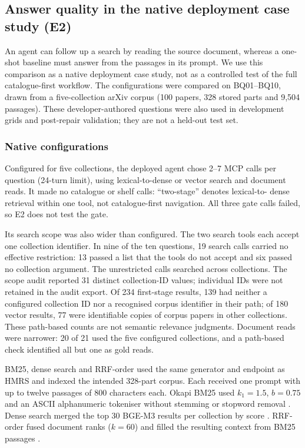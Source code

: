 \subsection{Answer quality in the native deployment case study (E2)}
\label{sec:e10}
\label{sec:external-baselines}
\label{sec:exp-e2}
An agent can follow up a search by reading the source document, whereas a
one-shot baseline must answer from the passages in its prompt. We use this
comparison as a native deployment case study, not as a controlled test of the
full catalogue-first workflow. The configurations were compared on BQ01--BQ10,
drawn from a five-collection
arXiv corpus (100 papers, 328 stored parts and 9{,}504 passages). These
developer-authored questions were also used in development grids and
post-repair validation; they are not a held-out test set.

\subsubsection{Native configurations}
Configured for five collections, the deployed agent chose 2--7 MCP calls per
question (24-turn limit), using lexical-to-dense or vector search and document
reads. It made no catalogue or shelf calls: ``two-stage'' denotes lexical-to-
dense retrieval within one tool, not catalogue-first navigation. All three
gate calls failed, so E2 does not test the gate.

Its search scope was also wider than configured. The two search tools each
accept one collection identifier. In nine of the ten questions, 19 search
calls carried no effective restriction: 13 passed a list that the tools do
not accept and six passed no collection argument. The unrestricted calls
searched across collections. The scope audit reported 31 distinct
collection-ID values; individual IDs were not retained in the audit export.
Of 234 first-stage results, 139 had neither a
configured collection ID nor a recognised corpus identifier in their path;
of 180 vector results, 77 were identifiable copies of corpus papers in
other collections. These path-based counts are not semantic relevance
judgments. Document reads were narrower: 20 of 21 used the five configured
collections, and a path-based check identified all but one as gold reads.

BM25, dense search and RRF-order used the same generator and endpoint as
HMRS and indexed the intended 328-part corpus. Each received one prompt with up to twelve passages of 800
characters each. Okapi BM25 used $k_1=1.5$, $b=0.75$ and an ASCII
alphanumeric tokeniser without stemming or stopword removal \citep{bm25}.
Dense search merged the top 30 BGE-M3 results per collection by score
\citep{bge-m3}. RRF-order fused document ranks ($k=60$) and filled the
resulting context from BM25 passages \citep{rrf-cormack}.

